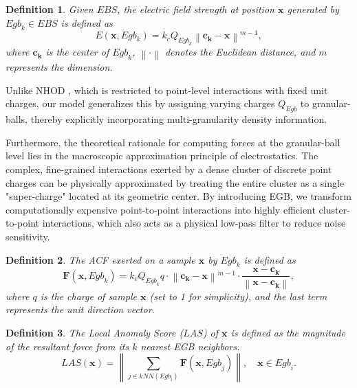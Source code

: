 \documentclass[times, review, 10pt]{elsarticle}
\newtheorem{definition}{Definition}
\begin{document}
\begin{definition}
Given $EBS$, the electric field strength at position $\boldsymbol{x}$ generated by ${Egb}_{{k}} \in EBS$ is defined as
\begin{equation}
    E(\boldsymbol{x}, Egb_{k}) = k_c Q_{{Egb}_k}\left\|\boldsymbol{c_k}-\boldsymbol{x}\right\|^{m-1},
\end{equation}
where $\boldsymbol{c_k}$ is the center of ${Egb}_k$, $\left\|\cdot\right\|$ denotes the Euclidean distance, and $m$ represents the dimension.
\end{definition}

Unlike NHOD \cite{zhu2022high}, which is restricted to point-level interactions with fixed unit charges, our model generalizes this by assigning varying charges $Q_{{Egb}}$ to granular-balls, thereby explicitly incorporating multi-granularity density information.

{Furthermore, the theoretical rationale for computing forces at the granular-ball level lies in the macroscopic approximation principle of electrostatics. The complex, fine-grained interactions exerted by a dense cluster of discrete point charges can be physically approximated by treating the entire cluster as a single "super-charge" located at its geometric center. By introducing EGB, we transform computationally expensive point-to-point interactions into highly efficient cluster-to-point interactions, which also acts as a physical low-pass filter to reduce noise sensitivity.}

\begin{definition}
    The ACF exerted on a sample $\boldsymbol{x}$ by ${Egb}_k$ is defined as
    \begin{equation}
    \boldsymbol{F}(\boldsymbol{x},{Egb}_k) = k_c {Q_{{Egb}_k} q \cdot }{\left\|\boldsymbol{c_k}-\boldsymbol{x}\right\|^{m-1}} \cdot \frac{\boldsymbol{x} - \boldsymbol{c_k}}{\left\|\boldsymbol{x} - \boldsymbol{c_k}\right\|},
    \label{eq:Coulomb force between gb and xi}
\end{equation}
where $q$ is the charge of sample $\boldsymbol{x}$ (set to 1 for simplicity), and the last term represents the unit direction vector.
\end{definition}

\begin{definition}
The Local Anomaly Score ($LAS$) of $\boldsymbol{x}$ is defined as the magnitude of the resultant force from its $k$ nearest EGB neighbors.
\begin{equation}
    LAS(\boldsymbol{x}) = \left\| \sum_{j \in kNN({Egb}_i)} \boldsymbol{F}\left(\boldsymbol{x}, {Egb}_j\right) \right\|, \quad \boldsymbol{x} \in {Egb}_i.
\label{eq:Coulomb resultant force of xi}
\end{equation}
\end{definition}
\end{document}
